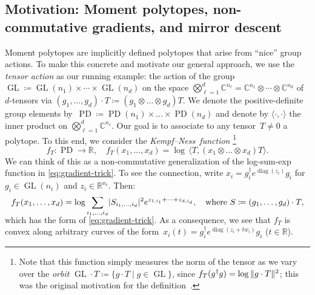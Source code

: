 \documentclass[11pt,letterpaper]{article}
\numberwithin{equation}{section}
\newcommand{\ot}{\otimes}
\newcommand{\RR}{\mathbb{R}}
\newcommand{\CC}{\mathbb{C}}
\DeclareMathOperator{\PD}{PD}
\DeclareMathOperator{\GL}{GL}
\DeclareMathOperator{\diag}{diag}
\DeclarePairedDelimiter\abs{\lvert}{\rvert}
\DeclarePairedDelimiter\norm{\lVert}{\rVert}
\begin{document}
\subsection{Motivation: Moment polytopes, non-commutative gradients, and mirror descent}\label{sub:intro primer}
Moment polytopes are implicitly defined polytopes that arise from ``nice'' group actions.
To make this concrete and motivate our general approach, we use the \emph{tensor action} as our running example:
the action of the group $\GL\coloneqq  \GL(n_1)\times\cdots\times \GL(n_d)$ on the space $\bigotimes_{\ell=1}^d \CC^{n_\ell} = \CC^{n_1} \ot \cdots \ot \CC^{n_d}$ of $d$-tensors via $(g_1,\dots,g_d)\cdot T\coloneqq (g_1\otimes\dots\otimes g_d)T$.
We denote the positive-definite group elements by~$\PD \coloneqq \PD(n_1)\times\dots\times\PD(n_d)$ and denote by $\langle\cdot,\cdot\rangle$ the inner product on $\bigotimes_{\ell=1}^d \CC^{n_\ell}$.
Our goal is to associate to any tensor~$T\neq0$ a polytope.
To this end, we consider the \emph{Kempf--Ness~function}%
\footnote{Note that this function simply measures the norm of the tensor as we vary over the \emph{orbit} $\GL \cdot T \coloneqq \{ g \cdot T \mid g \in \GL \}$, since $f_T(g^\dagger g) = \log \, \norm{g \cdot T}^2$; this was the original motivation for the definition~\cite{Kempf-Ness-79}.}
\begin{equation}\label{eq:kn T}
    f_T \colon \PD\rightarrow\RR, \quad f_T(x_1,\dots,x_d) = \log\,\langle T, (x_1\otimes\dots\otimes x_d)T\rangle.
\end{equation}
We can think of this as a non-commutative generalization of the log-sum-exp function in \cref{eq:gradient-trick}.
To see the connection, write $x_i = g_i^\dagger e^{\diag(z_i)} g_i$ for $g_i \in \GL(n_i)$ and $z_i \in \RR^{n_i}$.
Then:
\begin{align*}
    f_T(x_1,\dots,x_d) = \log \smash{\sum_{i_1,\dots,i_d}} \abs{S_{i_1,\dots,i_d}}^2 e^{z_{1,i_1} + \cdots + z_{d,i_d}},
    \quad
    \text{where } S \coloneqq (g_1,\ldots,g_d) \cdot T,
\end{align*}
which has the form of \cref{eq:gradient-trick}.
As a consequence, we see that $f_T$ is convex along arbitrary curves of the form~$x_i(t) = g_i^\dagger e^{\diag(z_i + t w_i)} g_i$ ($t \in \RR$).%
\end{document}
